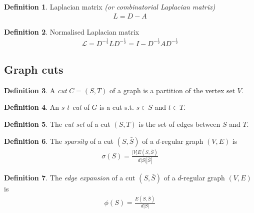 \documentclass{article}
\theoremstyle{definition}
\newtheorem{definition}{Definition}[section]
\begin{document}
\theoremstyle{definition}
\begin{definition}{Laplacian matrix \emph{(or combinatorial Laplacian matrix)}}
  \begin{align*}
    L = D - A
  \end{align*}
\end{definition}


\theoremstyle{definition}
\begin{definition}{Normalised Laplacian matrix}
  \begin{align*}
    \mathcal{L} = D^{-\frac{1}{2}} L D^{-\frac{1}{2}} = I - D^{-\frac{1}{2}} A D^{-\frac{1}{2}}
  \end{align*}
\end{definition}



\subsection{Graph cuts}

\theoremstyle{definition}
\begin{definition}
  A \emph{cut} $C = (S, T)$ of a graph is a partition of the vertex set $V$.
\end{definition}

\theoremstyle{definition}
\begin{definition}
  An \emph{$s$-$t$-cut} of $G$ is a cut s.t. $s \in S$ and $t \in T$.
\end{definition}

\theoremstyle{definition}
\begin{definition}
  The \emph{cut set} of a cut $(S, T)$ is the set of edges between $S$ and $T$.
\end{definition}

\theoremstyle{definition}
\begin{definition}
  The \emph{sparsity} of a cut $(S, \bar{S})$ of a $d$-regular graph $(V, E)$ is
  \begin{align*}
    \sigma(S) = \frac{|V| E(S, \bar{S})}{d|S||\bar{S}|}
  \end{align*}
\end{definition}

\theoremstyle{definition}
\begin{definition}
  The \emph{edge expansion} of a cut $(S, \bar{S})$ of a $d$-regular graph $(V, E)$ is
  \begin{align*}
    \phi(S) = \frac{E(S, \bar{S})}{d|S|}
  \end{align*}
\end{definition}
\end{document}

